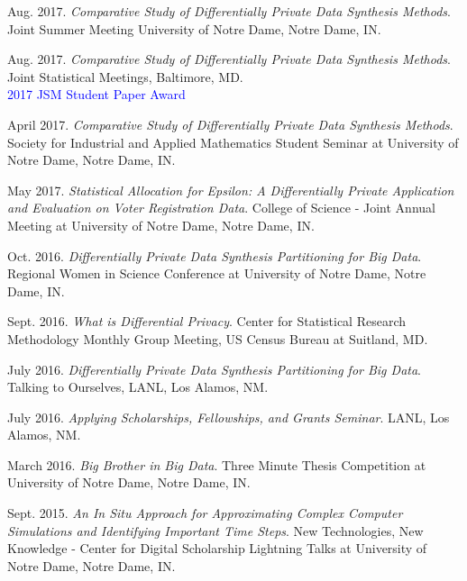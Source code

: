 \begin{etaremune}[topsep=0pt, itemsep=2.5pt, partopsep=0pt, parsep=0pt]
    \item Aug. 2017. \textit{Comparative Study of Differentially Private Data Synthesis Methods}. Joint Summer Meeting University of Notre Dame, Notre Dame, IN.
    
    \item Aug. 2017. \textit{Comparative Study of Differentially Private Data Synthesis Methods}. Joint Statistical Meetings, Baltimore, MD.\\
    \textcolor{blue}{2017 JSM Student Paper Award}
    
    \item April 2017. \textit{Comparative Study of Differentially Private Data Synthesis Methods}. Society for Industrial and Applied Mathematics Student Seminar at University of Notre Dame, Notre Dame, IN.
    
    \item May 2017. \textit{Statistical Allocation for Epsilon: A Differentially Private Application and Evaluation on Voter Registration Data}. College of Science - Joint Annual Meeting at University of Notre Dame, Notre Dame, IN.
    
    \item Oct. 2016. \textit{Differentially Private Data Synthesis Partitioning for Big Data}. Regional Women in Science Conference at University of Notre Dame, Notre Dame, IN. 
    
    \item Sept. 2016. \textit{What is Differential Privacy}. Center for Statistical Research Methodology Monthly Group Meeting, US Census Bureau at Suitland, MD. 
    
    \item July 2016. \textit{Differentially Private Data Synthesis Partitioning for Big Data}. Talking to Ourselves, LANL, Los Alamos, NM.
    
    \item July 2016. \textit{Applying Scholarships, Fellowships, and Grants Seminar}. LANL, Los Alamos, NM.
    
    \item March 2016. \textit{Big Brother in Big Data}. Three Minute Thesis Competition at University of Notre Dame, Notre Dame, IN.
    
    \item Sept. 2015. \textit{An In Situ Approach for Approximating Complex Computer Simulations and Identifying Important Time Steps}. New Technologies, New Knowledge - Center for Digital Scholarship Lightning Talks at University of Notre Dame, Notre Dame, IN.
    

\end{etaremune}
